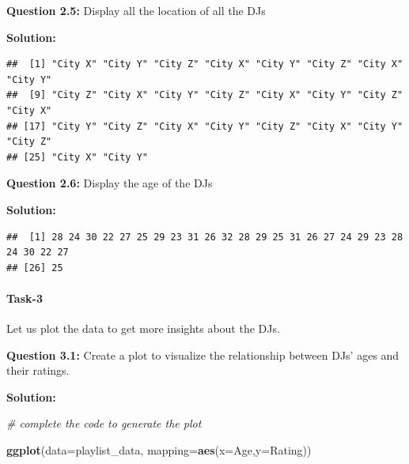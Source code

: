 \documentclass[
]{article}
\newenvironment{Shaded}{\begin{snugshade}}{\end{snugshade}}
\newcommand{\AttributeTok}[1]{\textcolor[rgb]{0.13,0.29,0.53}{#1}}
\newcommand{\CommentTok}[1]{\textcolor[rgb]{0.56,0.35,0.01}{\textit{#1}}}
\newcommand{\FunctionTok}[1]{\textcolor[rgb]{0.13,0.29,0.53}{\textbf{#1}}}
\newcommand{\NormalTok}[1]{#1}
\newcommand{\SpecialCharTok}[1]{\textcolor[rgb]{0.81,0.36,0.00}{\textbf{#1}}}
\begin{document}
\textbf{Question 2.5:} Display all the location of all the DJs

\textbf{Solution:}

\begin{Shaded}
\end{Shaded}

\begin{verbatim}
##  [1] "City X" "City Y" "City Z" "City X" "City Y" "City Z" "City X" "City Y"
##  [9] "City Z" "City X" "City Y" "City Z" "City X" "City Y" "City Z" "City X"
## [17] "City Y" "City Z" "City X" "City Y" "City Z" "City X" "City Y" "City Z"
## [25] "City X" "City Y"
\end{verbatim}

\textbf{Question 2.6:} Display the age of the DJs

\textbf{Solution:}

\begin{Shaded}
\end{Shaded}

\begin{verbatim}
##  [1] 28 24 30 22 27 25 29 23 31 26 32 28 29 25 31 26 27 24 29 23 28 24 30 22 27
## [26] 25
\end{verbatim}

\hypertarget{task-3}{%
\paragraph{Task-3}\label{task-3}}

Let us plot the data to get more insights about the DJs.

\textbf{Question 3.1:} Create a plot to visualize the relationship
between DJs' ages and their ratings.

\textbf{Solution:}

\begin{Shaded}
\begin{Highlighting}[]
\CommentTok{\# complete the code to generate the plot}

\FunctionTok{ggplot}\NormalTok{(}\AttributeTok{data=}\NormalTok{playlist\_data, }\AttributeTok{mapping=}\FunctionTok{aes}\NormalTok{(}\AttributeTok{x=}\NormalTok{Age,}\AttributeTok{y=}\NormalTok{Rating))}
\end{Highlighting}
\end{Shaded}
\end{document}
